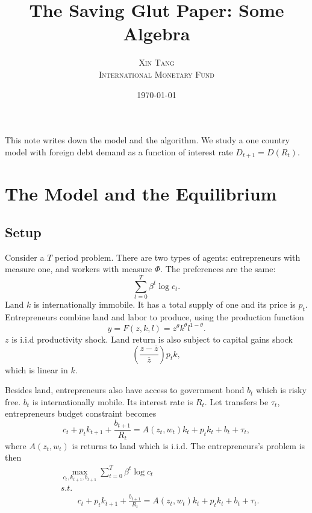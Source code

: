 \documentclass[twoside,11pt,leqno]{article}
\title{\vspace{-1cm}\Large{{\textsf{The Saving Glut Paper: Some Algebra}}}}
\author{\normalsize\textsc{Xin Tang} \\ \normalsize\textsc{International Monetary Fund}}
\date{\normalsize\today}
\begin{document}
\maketitle

This note writes down the model and the algorithm. We study a one country model with foreign debt demand as a function of interest rate $D_{t+1} = D(R_t)$.

\section{The Model and the Equilibrium}

\subsection{Setup}

Consider a $T$ period problem. There are two types of agents: entrepreneurs with measure one, and workers with measure $\Phi$. The preferences are the same:
\begin{equation*}
    \sum_{t=0}^T \beta^t \log c_t.
\end{equation*}
Land $k$ is internationally immobile. It has a total supply of one and its price is $p_t$. Entrepreneurs combine land and labor to produce, using the production function
\begin{equation*}
    y = F(z,k,l) = z^{\theta}k^{\theta}l^{1-\theta}.
\end{equation*}
$z$ is i.i.d productivity shock. Land return is also subject to capital gains shock
\begin{equation}
    \left(\frac{z-\overline{z}}{\overline{z}}\right) p_{t}k,
\end{equation}
which is linear in $k$.

Besides land, entrepreneurs also have access to government bond $b_t$ which is risky free. $b_t$ is internationally mobile. Its interest rate is $R_t$. Let transfers be $\tau_t$, entrepreneurs budget constraint becomes
\begin{equation*}
    c_t + p_t k_{t+1} + \frac{b_{t+1}}{R_t} = A(z_t,w_t)k_t + p_t k_t + b_t + \tau_t,
\end{equation*}
where $A(z_t,w_t)$ is returns to land which is i.i.d. The entrepreneurs's problem is then
\begin{align*}
    & \max_{c_t,k_{t+1},b_{t+1}} \sum_{t=0}^T \beta^t \log c_t \\
    & s.t. \\
    & \qquad c_t + p_t k_{t+1} + \frac{b_{t+1}}{R_t} = A(z_t,w_t)k_t + p_t k_t + b_t + \tau_t.
\end{align*}
\end{document}
